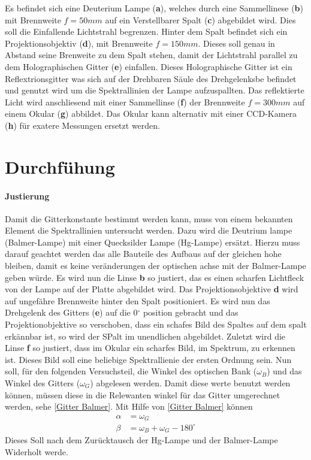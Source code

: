 Es befindet sich eine Deuterium Lampe (\textbf{a}), welches durch eine Sammellinese (\textbf{b}) mit Brennweite $f = 50mm$ auf ein Verstellbarer Spalt (\textbf{c}) abgebildet wird. 
Dies soll die Einfallende Lichtstrahl begrenzen. 
Hinter dem Spalt befindet sich ein Projektionsobjektiv (\textbf{d}), mit Brennweite $f = 150mm$. 
Dieses soll genau in Abstand seine Brenweite zu dem Spalt stehen, damit der Lichtstrahl parallel zu dem Holographischen Gitter (\textbf{e}) einfallen. 
Dieses Holographische Gitter ist ein Reflextrionsgitter was sich auf der Drehbaren Säule des Drehgelenksbe befindet und genutzt wird um die Spektrallinien der Lampe aufzuspallten. 
Das reflektierte Licht wird anschliesend mit einer Sammellinse (\textbf{f}) der Brennweite $f=300mm$ auf einem Okular (\textbf{g}) abbildet.
Das Okular kann alternativ mit einer CCD-Kamera (\textbf{h}) für exatere Messungen ersetzt werden.

\section{Durchfühung}

\paragraph{Justierung}

Damit die Gitterkonstante bestimmt werden kann, muss von einem bekannten Element die Spektrallinien untersucht werden. 
Dazu wird die Deutrium lampe (Balmer-Lampe) mit einer Quecksilder Lampe (Hg-Lampe) ersätzt. 
Hierzu muss darauf geachtet werden das alle Bauteile des Aufbaus auf der gleichen hohe bleiben, damit es keine veränderungen der optischen achse mit der Balmer-Lampe geben würde.
Es wird nun die Linse \textbf{b} so justiert, das es einen scharfen Lichtfleck von der Lampe auf der Platte abgebildet wird.
Das Projektionsobjektive \textbf{d} wird auf ungefähre Brennweite hinter den Spalt positioniert. 
Es wird nun das Drehgelenk des Gitters (\textbf{e}) auf die 0$^\circ$ position gebracht und das Projektionobjektive so verschoben, dass ein schafes Bild des Spaltes auf dem spalt erkännbar ist, so wird der SPalt im unendlichen abgebildet.
Zuletzt wird die Linse \textbf{f} so justiert, dass im Okular ein scharfes Bild, im Spektrum, zu erkennen ist. Dieses Bild soll eine beliebige Spektrallienie der ersten Ordnung sein.
Nun soll, für den folgenden Versuchsteil, die Winkel des optischen Bank ($\omega_B$) und das Winkel des Gitters ($\omega_G$) abgelesen werden.  
Damit diese werte benutzt werden können, müssen diese in die Relewanten winkel für das Gitter umgerechnet werden, sehe \cref{Gitter Balmer}. 
Mit Hilfe von \cref{Gitter Balmer} können 
\begin{align}
    \alpha &= \omega_G \\  \beta &= \omega_B + \omega_G - 180^\circ 
\end{align}
Dieses Soll nach dem Zurücktausch der Hg-Lampe und der Balmer-Lampe Widerholt werde. 


